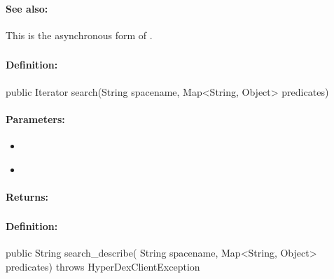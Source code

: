 \paragraph{See also:}  This is the asynchronous form of .

\pagebreak
\subsubsection{}
\label{api:java:search}


\paragraph{Definition:}
\begin{javacode}
public Iterator search(String spacename, Map<String, Object> predicates)
\end{javacode}

\paragraph{Parameters:}
\begin{itemize}[noitemsep]
\item {}\\

\item {}\\

\end{itemize}

\paragraph{Returns:}


\pagebreak
\subsubsection{}
\label{api:java:search_describe}


\paragraph{Definition:}
\begin{javacode}
public String search_describe(
        String spacename,
        Map<String, Object> predicates) throws HyperDexClientException
\end{javacode}

